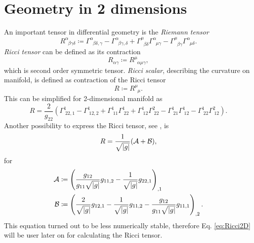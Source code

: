 \section{Geometry in 2 dimensions}
An important tensor in differential geometry is the \emph{Riemann tensor}
\begin{equation}
    R^\alpha_{\;\;\beta\gamma\delta}\coloneqq \Gamma^\alpha_{\;\;\beta\delta,\gamma}-\Gamma^\alpha_{\;\;\beta\gamma,\delta}+\Gamma^\mu_{\;\;\beta\delta}\Gamma^\alpha_{\;\;\mu\gamma}-\Gamma^\mu_{\;\;\beta\gamma}\Gamma^\alpha_{\;\;\mu\delta}.
\end{equation}
\emph{Ricci tensor} can be defined as its contraction 
\begin{equation}
    R_{\alpha\gamma}\coloneqq R^\mu_{\;\;\alpha\mu\gamma},
\end{equation}
which is second order symmetric tensor.
\emph{Ricci scalar}, describing the curvature on manifold, is defined as contraction of the Ricci tensor
\begin{equation}
    R\coloneqq R^\mu_{\;\;\mu}.
\end{equation}
This can be simplified for 2-dimensional manifold as
\begin{equation}
    R=\frac{2}{g_{22}}\left(\Gamma^1_{\;22,1}-\Gamma^1_{\;12,2}+\Gamma^1_{\;11}\Gamma^1_{\;22}+\Gamma^1_{\;12}\Gamma^2_{\;22}-\Gamma^1_{\;21}\Gamma^1_{\;12}-\Gamma^1_{\;22}\Gamma^2_{\;12}\right).
    \label{eq:Ricci2D}
\end{equation}
Another possibility to express the Ricci tensor, see \citet[eq. 6,7]{geometricTensorLipkin}, is
\begin{equation}
    R=\frac{1}{\sqrt{\left|{g}\right|}}(\mathcal{A}+\mathcal{B}),
\end{equation}
for
\begin{align}
    \mathcal{A}&\coloneqq \left(\frac{g_{12}}{g_{11}\sqrt{\left|{g}\right|}}g_{11,2}-\frac{1}{\sqrt{\left|{g}\right|}}g_{22,1}\right)_{,1}\\
    \mathcal{B}&\coloneqq \left(\frac{2}{\sqrt{\left|{g}\right|}}g_{12,1}-\frac{1}{\sqrt{\left|{g}\right|}}g_{11,2}-\frac{g_{12}}{g_{11}\sqrt{\left|{g}\right|}}g_{11,1}\right)_{,2}.
\end{align}
This equation turned out to be less numerically stable, therefore Eq. \ref{eq:Ricci2D} will be user later on for calculating the Ricci tensor.

